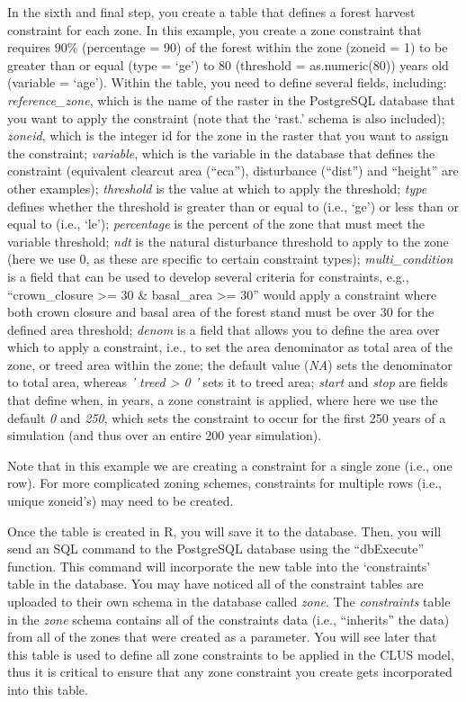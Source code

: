 \documentclass[
]{article}
\begin{document}
In the sixth and final step, you create a table that defines a forest
harvest constraint for each zone. In this example, you create a zone
constraint that requires 90\% (percentage = 90) of the forest within the
zone (zoneid = 1) to be greater than or equal (type = `ge') to 80
(threshold = as.numeric(80)) years old (variable = `age'). Within the
table, you need to define several fields, including:
\emph{reference\_zone}, which is the name of the raster in the
PostgreSQL database that you want to apply the constraint (note that the
`rast.' schema is also included); \emph{zoneid}, which is the integer id
for the zone in the raster that you want to assign the constraint;
\emph{variable}, which is the variable in the database that defines the
constraint (equivalent clearcut area (``eca''), disturbance (``dist'')
and ``height'' are other examples); \emph{threshold} is the value at
which to apply the threshold; \emph{type} defines whether the threshold
is greater than or equal to (i.e., `ge') or less than or equal to (i.e.,
`le'); \emph{percentage} is the percent of the zone that must meet the
variable threshold; \emph{ndt} is the natural disturbance threshold to
apply to the zone (here we use 0, as these are specific to certain
constraint types); \emph{multi\_condition} is a field that can be used
to develop several criteria for constraints, e.g., ``crown\_closure
\textgreater= 30 \& basal\_area \textgreater= 30'' would apply a
constraint where both crown closure and basal area of the forest stand
must be over 30 for the defined area threshold; \emph{denom} is a field
that allows you to define the area over which to apply a constraint,
i.e., to set the area denominator as total area of the zone, or treed
area within the zone; the default value (\emph{NA}) sets the denominator
to total area, whereas \emph{' treed \textgreater{} 0 '} sets it to
treed area; \emph{start} and \emph{stop} are fields that define when, in
years, a zone constraint is applied, where here we use the default
\emph{0} and \emph{250}, which sets the constraint to occur for the
first 250 years of a simulation (and thus over an entire 200 year
simulation).

Note that in this example we are creating a constraint for a single zone
(i.e., one row). For more complicated zoning schemes, constraints for
multiple rows (i.e., unique zoneid's) may need to be created.

Once the table is created in R, you will save it to the database. Then,
you will send an SQL command to the PostgreSQL database using the
``dbExecute'' function. This command will incorporate the new table into
the `constraints' table in the database. You may have noticed all of the
constraint tables are uploaded to their own schema in the database
called \emph{zone}. The \emph{constraints} table in the \emph{zone}
schema contains all of the constraints data (i.e., ``inherits'' the
data) from all of the zones that were created as a parameter. You will
see later that this table is used to define all zone constraints to be
applied in the CLUS model, thus it is critical to ensure that any zone
constraint you create gets incorporated into this table.
\end{document}
